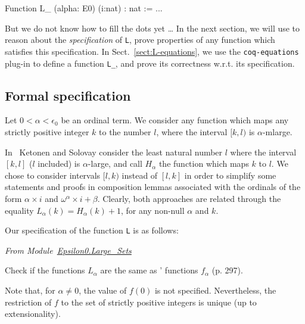\begin{Coqbad}
Function L_ (alpha: E0) (i:nat) :  nat := ...
\end{Coqbad}

But we do not know how to fill the dots yet \dots{}   In the next section, we will 
use \coq{} to reason  about the \emph{specification} of \texttt{L},
prove properties of any function which satisfies this specification.
In Sect.~\ref{sect:L-equations}, we use the \texttt{coq-equations} plug-in
to define a function \texttt{L\_}, and prove its correctness w.r.t. its specification.


\subsection{Formal specification}


Let $0<\alpha<\epsilon_0$ be an ordinal term. We consider any  function which  maps  any strictly positive integer $k$ to the number $l$, where 
the interval $[k,l)$ is $\alpha$-mlarge.

\begin{remark}
In~\cite{KS81} Ketonen and Solovay consider the least natural number $l$ where the interval $[k,l]$ ($l$ included) is $\alpha$-large, and call $H_\alpha$ the function which maps $k$ to $l$. We chose to consider intervals $[l,k)$ instead of $[l,k]$
in order to simplify  some statements and proofs in composition lemmas associated with the ordinals of the form $\alpha\times i$ and 
$\omega^\alpha\times i + \beta$.
Clearly, both approaches are related through the equality
$L_\alpha(k)=H_\alpha(k)+1$, for any non-null $\alpha$ and $k$.
\end{remark}




Our specification of the function \texttt{L} is as follows:

\emph{From Module~\href{../theories/html/hydras.Epsilon0.Large_Sets.html}{Epsilon0.Large\_Sets}}




\begin{todo}
 Check if the functions $L_\alpha$ are the same as
\cite{KS81}' functions $f_\alpha$ (p. 297).
\end{todo}


Note that, for $\alpha\not=0$, the value of $f(0)$ is not specified.
Nevertheless, the restriction of $f$ to the set of strictly positive integers is unique (up to extensionality).


